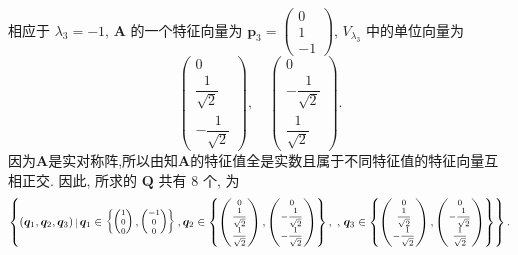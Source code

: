 \documentclass[../../main.tex]{subfiles}
\begin{document}
\begin{solution}
相应于 \( \lambda_3 = -1 \), \( \boldsymbol{A} \) 的一个特征向量为 \( \boldsymbol{p}_3 = \begin{pmatrix} 0 \\ 1 \\ -1 \end{pmatrix} \), \( V_{\lambda_3} \) 中的单位向量为
\[
\begin{pmatrix} 0 \\ \dfrac{1}{\sqrt{2}} \\ -\dfrac{1}{\sqrt{2}} \end{pmatrix}, \quad \begin{pmatrix} 0 \\ -\dfrac{1}{\sqrt{2}} \\ \dfrac{1}{\sqrt{2}} \end{pmatrix}.
\]
因为$\boldsymbol{A}$是实对称阵,所以由知$\boldsymbol{A}$的特征值全是实数且属于不同特征值的特征向量互相正交.
因此, 所求的 \( \boldsymbol{Q} \) 共有 \( 8 \) 个, 为
$$
\begin{scriptsize}
\left\{ (\boldsymbol{q}_1, \boldsymbol{q}_2, \boldsymbol{q}_3) \,\big|\, \boldsymbol{q}_1 \in \left\{ \begin{pmatrix} 1 \\ 0 \\ 0 \end{pmatrix}, \begin{pmatrix} -1 \\ 0 \\ 0 \end{pmatrix} \right\}, \boldsymbol{q}_2 \in \left\{ \begin{pmatrix} 0 \\ \dfrac{1}{\sqrt{2}} \\ \dfrac{1}{\sqrt{2}} \end{pmatrix}, \begin{pmatrix} 0 \\ -\dfrac{1}{\sqrt{2}} \\ -\dfrac{1}{\sqrt{2}} \end{pmatrix} \right\}, \right.,
\left. \boldsymbol{q}_3 \in \left\{ \begin{pmatrix} 0 \\ \dfrac{1}{\sqrt{2}} \\ -\dfrac{1}{\sqrt{2}} \end{pmatrix}, \begin{pmatrix} 0 \\ -\dfrac{1}{\sqrt{2}} \\ \dfrac{1}{\sqrt{2}} \end{pmatrix} \right\} \right\}.
\end{scriptsize}
$$
\end{solution}
\end{document}
